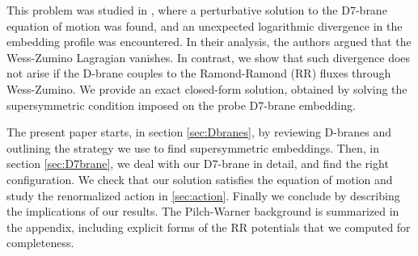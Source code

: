This problem was studied in \cite{Albash:2011nw}, where a perturbative solution to the D7-brane equation of motion was found, and an unexpected logarithmic divergence in the embedding profile was encountered. In their analysis, the authors argued that the Wess-Zumino Lagragian vanishes. In contrast, we show that such divergence does not arise if the D-brane couples to the Ramond-Ramond (RR) fluxes through Wess-Zumino. We provide an exact closed-form solution, obtained
by solving the supersymmetric condition imposed on the probe D7-brane embedding.


The present paper starts, in section \ref{sec:Dbranes}, by reviewing D-branes and outlining the strategy we use to find supersymmetric embeddings. Then, in section \ref{sec:D7brane}, we deal with our D7-brane in detail, and find the right configuration. We check that our solution satisfies the equation of motion and study the renormalized action in \ref{sec:action}. Finally we conclude by describing the implications of our results. The Pilch-Warner background is summarized in the appendix, including explicit forms of the RR potentials that we computed for completeness. 

